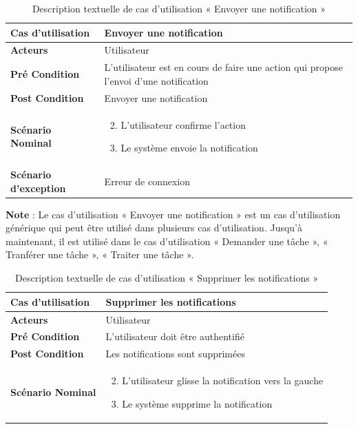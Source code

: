 
\begin{longtable}{|p{5cm}|p{10cm}|}
  \caption{Description textuelle de cas d'utilisation « Envoyer une notification »} \label{tab:use_case_envoyer_notifications} \\
\hline
\textbf{Cas d'utilisation}&Envoyer une notification\\
\hline
\textbf{Acteurs}&Utilisateur \\
\hline
\textbf{Pré Condition}&L'utilisateur est en cours de faire une action qui propose l'envoi d'une notification\\
\hline
\textbf{Post Condition}&Envoyer une notification\\
\hline
\textbf{Scénario Nominal}&
\vspace{-\baselineskip}
\begin{enumerate}
    \setcounter{enumi}{1}
        \item L'utilisateur confirme l'action
        \item Le système envoie la notification
\end{enumerate}\\
\hline
\textbf{Scénario d'exception}&Erreur de connexion\\
\hline

\end{longtable}

\textbf{Note} : Le cas d'utilisation « Envoyer une notification » est un cas d'utilisation générique qui peut être utilisé dans plusieurs cas d'utilisation. Jusqu'à maintenant, il est utilisé dans le cas d'utilisation « Demander une tâche », « Tranférer une tâche », « Traiter une tâche ».




\begin{longtable}{|p{5cm}|p{10cm}|}
  \caption{Description textuelle de cas d'utilisation « Supprimer les notifications »} \label{tab:use_case_supprimer_notifications} \\
\hline
\textbf{Cas d'utilisation}&Supprimer les notifications\\
\hline
\textbf{Acteurs}&Utilisateur \\
\hline
\textbf{Pré Condition}&L'utilisateur doit être authentifié\\
\hline
\textbf{Post Condition}&Les notifications sont supprimées\\
\hline
\textbf{Scénario Nominal}&
\vspace{-\baselineskip}
\begin{enumerate}
    \setcounter{enumi}{1}
      \item L'utilisateur glisse la notification vers la gauche
      \item Le système supprime la notification
\end{enumerate}\\
\hline

\end{longtable}

